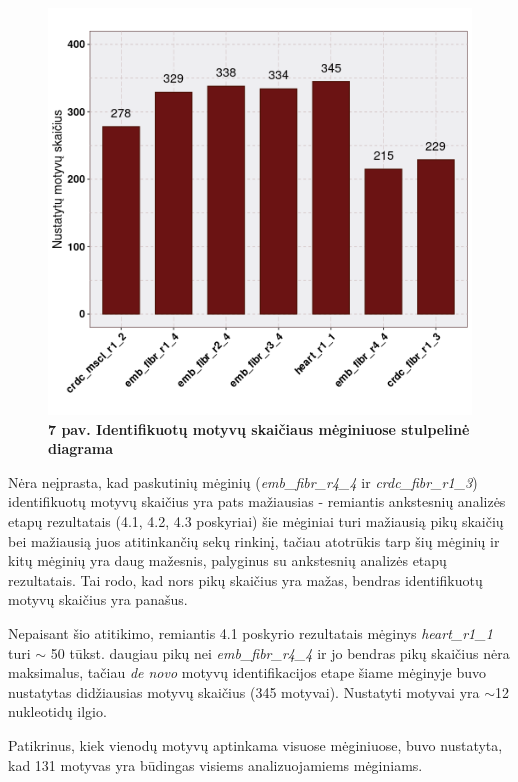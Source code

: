 \documentclass[12pt]{article}
\begin{document}
\begin{figure}[htb]
    \begin{center}
        \includegraphics[width=0.6\linewidth]{../Figures/motifs_in_samples.png}
        \vspace{-2\baselineskip}
        \caption*{\small\textbf{7 pav. Identifikuotų motyvų skaičiaus
                                mėginiuose stulpelinė diagrama}}
    \end{center}
\end{figure}

Nėra neįprasta, kad paskutinių mėginių (\small\emph{emb\_fibr\_r4\_4} ir
\small\emph{crdc\_fibr\_r1\_3}) identifikuotų motyvų skaičius yra pats
mažiausias - remiantis ankstesnių analizės etapų rezultatais (4.1, 4.2, 4.3
poskyriai) šie mėginiai turi mažiausią pikų skaičių bei mažiausią juos
atitinkančių sekų rinkinį, tačiau atotrūkis tarp šių mėginių ir kitų mėginių
yra daug mažesnis, palyginus su ankstesnių analizės etapų rezultatais.
Tai rodo, kad nors pikų skaičius yra mažas, bendras identifikuotų motyvų
skaičius yra panašus.

Nepaisant šio atitikimo, remiantis 4.1 poskyrio rezultatais mėginys
\small\emph{heart\_r1\_1} turi \(\sim\) 50 tūkst. daugiau pikų nei
\small\emph{emb\_fibr\_r4\_4} ir jo bendras pikų skaičius nėra maksimalus,
tačiau \emph{de novo} motyvų identifikacijos etape šiame mėginyje buvo
nustatytas didžiausias motyvų skaičius (345 motyvai). Nustatyti motyvai yra
\(\sim\)12 nukleotidų ilgio.

Patikrinus, kiek vienodų motyvų aptinkama visuose mėginiuose, buvo nustatyta,
kad 131 motyvas yra būdingas visiems analizuojamiems mėginiams.

\newpage

\end{document}
